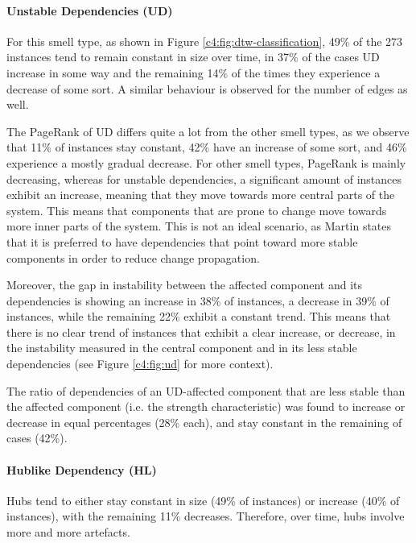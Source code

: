\paragraph{Unstable Dependencies (UD)} For this smell type, as shown in Figure \ref{c4:fig:dtw-classification}, 49\% of the 273 instances tend to remain constant in size over time, in 37\% of the cases UD increase in some way and the remaining 14\% of the times they experience a decrease of some sort. A similar behaviour is observed for the number of edges as well.

The PageRank of UD differs quite a lot from the other smell types, as we observe that 11\% of instances stay constant, 42\% have an increase of some sort, and 46\% experience a mostly gradual decrease. 
For other smell types, PageRank is mainly decreasing, whereas for unstable dependencies, a significant amount of instances exhibit an increase, meaning that they move towards more central parts of the system.
This means that components that are prone to change move towards more inner parts of the system.
This is not an ideal scenario, as Martin \cite{Martin2018} states that it is preferred to have dependencies that point toward more stable components in order to reduce change propagation.

Moreover, the gap in instability between the affected component and its dependencies is showing an increase in 38\% of instances, a decrease in 39\% of instances, while the remaining 22\% exhibit a constant trend. 
This means that there is no clear trend of instances that exhibit a clear increase, or decrease, in the instability measured in the central component and in its less stable dependencies (see Figure \ref{c4:fig:ud} for more context).

The ratio of dependencies of an UD-affected component that are less stable than the affected component (i.e. the strength characteristic) was found to increase or decrease in equal percentages (28\% each), and stay constant in the remaining of cases (42\%).

\paragraph{Hublike Dependency (HL)} Hubs tend to either stay constant in size (49\% of instances) or increase (40\% of instances), with the remaining 11\% decreases.
Therefore, over time, hubs involve more and more artefacts.


